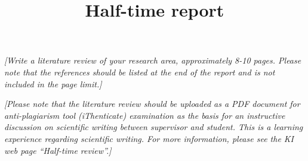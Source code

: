 \documentclass{kihalftime}
\title{Half-time report}
\author{\studentname}
\begin{document}
\maketitle
\thispagestyle{empty}
\newpage

\vspace{2cm}
\vspace{2cm}
\tableofcontents
\null\vfill
\halftimedate
\thispagestyle{empty}
\newpage


{
\small
\textit{[Write a literature review of your research area, approximately 8-10 pages. Please note that the references should be listed at the end of the report and is not included in the page limit.]}

\noindent \textit{[Please note that the literature review should be uploaded as a PDF document for anti-plagiarism tool (iThenticate) examination as the basis for an instructive discussion on scientific writing between supervisor and student. This is a learning experience regarding scientific writing. For more information, please see the KI web page “Half-time review”.]}
}
\end{document}
